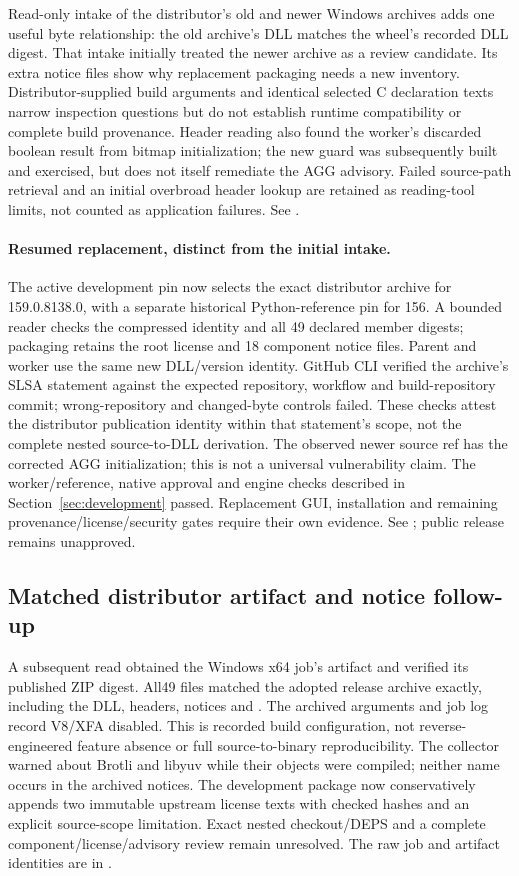 Read-only intake of the distributor's old and newer Windows archives adds
one useful byte relationship: the old archive's DLL matches the wheel's
recorded DLL digest. That intake initially treated the newer archive as a review
candidate. Its extra notice files show why replacement packaging needs a new
inventory. Distributor-supplied build arguments and identical selected C
declaration texts narrow inspection questions but do not establish runtime
compatibility or complete build provenance. Header reading also found the
worker's discarded boolean result from bitmap initialization; the new guard
was subsequently built and exercised, but does not itself remediate the AGG advisory. Failed source-path
retrieval and an initial overbroad header lookup are retained as reading-tool
limits, not counted as application failures. See
.

\paragraph{Resumed replacement, distinct from the initial intake.}
The active development pin now selects the exact distributor archive for
159.0.8138.0, with a separate historical Python-reference pin for 156. A bounded
reader checks the compressed identity and all 49 declared member digests;
packaging retains the root license and 18 component notice files. Parent and
worker use the same new DLL/version identity. GitHub CLI verified the archive's
SLSA statement against the expected repository, workflow and build-repository
commit; wrong-repository and changed-byte controls failed. These checks attest
the distributor publication identity within that statement's scope, not the
complete nested source-to-DLL derivation. The observed newer source ref has
the corrected AGG initialization; this is not a universal vulnerability claim.
The worker/reference, native approval and engine checks described in
Section~\ref{sec:development} passed. Replacement GUI, installation and remaining
provenance/license/security gates require their own evidence. See
; public release remains unapproved.

\subsection{Matched distributor artifact and notice follow-up}
A subsequent read obtained the Windows x64 job's artifact and verified its
published ZIP digest. All49 files matched the adopted release archive exactly,
including the DLL, headers, notices and . The archived arguments
and job log record V8/XFA disabled. This is recorded build configuration, not
reverse-engineered feature absence or full source-to-binary reproducibility.
The collector warned about Brotli and libyuv while their objects were compiled;
neither name occurs in the archived notices. The development package now
conservatively appends two immutable upstream license texts with checked hashes
and an explicit source-scope limitation. Exact nested checkout/DEPS and a
complete component/license/advisory review remain unresolved. The raw job and
artifact identities are in .

